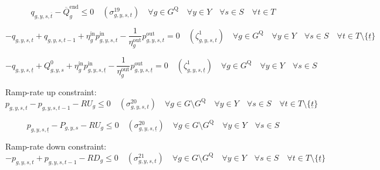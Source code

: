 \documentclass{article}
\newcommand{\sGenerators}{G}
\newcommand{\sStorage}{G^{\mathrm{Q}}}
\newcommand{\sYears}{Y}
\newcommand{\sScenarios}{S}
\newcommand{\sIntervals}{T}
\newcommand{\iGenerator}{g}
\newcommand{\iYear}{y}
\newcommand{\iScenario}{s}
\newcommand{\iInterval}{t}
\newcommand{\iIntervalTerminal}{\overline{\iInterval}}
\newcommand{\iIntervalStart}{\underline{\iInterval}}
\newcommand{\cRampRateUp}[1][\iGenerator]{RU_{#1}}
\newcommand{\cRampRateDown}[1][\iGenerator]{RD_{#1}}
\newcommand{\cStorageUnitEnergyIntervalEndMax}[1][\iGenerator]{\overline{Q}^{\mathrm{end}}_{#1}}
\newcommand{\cStorageUnitEfficiencyCharging}{\eta_{\iGenerator}^{\mathrm{in}}}
\newcommand{\cStorageUnitEfficiencyDischarging}{\eta_{\iGenerator}^{\mathrm{out}}}
\newcommand{\cPowerInitial}[1][\iGenerator,\iYear,\iScenario]{\hat{P}_{#1}}
\newcommand{\cStorageEnergyInitial}[1][\iGenerator,\iYear,\iScenario]{Q_{#1}^{0}}
\newcommand{\vPower}[1][\iGenerator,\iYear,\iScenario,\iInterval]{p_{#1}}
\newcommand{\vPowerIn}[1][\iGenerator,\iYear,\iScenario,\iInterval]{p^{\mathrm{in}}_{#1}}
\newcommand{\vPowerOut}[1][\iGenerator,\iYear,\iScenario,\iInterval]{p^{\mathrm{out}}_{#1}}
\newcommand{\vStorageUnitEnergy}[1][\iGenerator,\iYear,\iScenario,\iInterval]{q_{#1}}
\newcommand{\dMaxStorageEnergyIntervalEnd}[1][\iGenerator,\iYear,\iScenario,\iInterval]{\sigma_{#1}^{19}}
\newcommand{\dRampRateUp}[1][\iGenerator,\iYear,\iScenario,\iInterval]{\sigma_{#1}^{20}}
\newcommand{\dRampRateDown}[1][\iGenerator,\iYear,\iScenario,\iInterval]{\sigma_{#1}^{21}}
\newcommand{\dStorageEnergyTransition}[1][\iGenerator,\iYear,\iScenario,\iInterval]{\zeta_{#1}^{1}}
\newcommand{\sScenarioSets}{\quad \forall \iYear \in \sYears \quad \forall \iScenario \in \sScenarios \quad \forall \iInterval \in \sIntervals}
\begin{document}
\begin{equation}
	\vStorageUnitEnergy[\iGenerator,\iYear,\iScenario,\iIntervalTerminal] - \cStorageUnitEnergyIntervalEndMax \leq  0 \quad (\dMaxStorageEnergyIntervalEnd) \quad \forall \iGenerator \in \sStorage \sScenarioSets
\end{equation}

\begin{equation}
	- \vStorageUnitEnergy + \vStorageUnitEnergy[\iGenerator,\iYear,\iScenario,\iInterval-1] + \cStorageUnitEfficiencyCharging \vPowerIn - \frac{1}{\cStorageUnitEfficiencyDischarging} \vPowerOut = 0 \quad (\dStorageEnergyTransition) \quad \forall \iGenerator \in \sStorage \sScenarioSets \setminus \{\iIntervalStart\}
\end{equation}

\begin{equation}
	- \vStorageUnitEnergy[\iGenerator,\iYear,\iScenario,\iIntervalStart] + \cStorageEnergyInitial + \cStorageUnitEfficiencyCharging \vPowerIn[\iGenerator,\iYear,\iScenario,\iIntervalStart] - \frac{1}{\cStorageUnitEfficiencyDischarging} \vPowerOut[\iGenerator,\iYear,\iScenario,\iIntervalStart] = 0 \quad (\dStorageEnergyTransition[\iGenerator,\iYear,\iScenario,\iIntervalStart]) \quad \forall \iGenerator \in \sStorage \quad \forall \iYear \in \sYears \quad \forall \iScenario \in \sScenarios
\end{equation}

Ramp-rate up constraint:
\begin{equation}
	\vPower - \vPower[\iGenerator,\iYear,\iScenario,\iInterval-1] - \cRampRateUp \leq 0 \quad (\dRampRateUp) \quad \forall \iGenerator \in \sGenerators \setminus \sStorage \quad \forall \iYear \in \sYears \quad \forall \iScenario \in \sScenarios \quad \forall \iInterval \in \sIntervals \setminus \{\iIntervalStart\}
\end{equation}

\begin{equation}
	\vPower[\iGenerator,\iYear,\iScenario,\iIntervalStart] - \cPowerInitial - \cRampRateUp \leq 0 \quad (\dRampRateUp[\iGenerator,\iYear,\iScenario,\iIntervalStart]) \quad \forall \iGenerator \in \sGenerators \setminus \sStorage \quad \forall \iYear \in \sYears \quad \forall \iScenario \in \sScenarios
\end{equation}

Ramp-rate down constraint:
\begin{equation}
	- \vPower + \vPower[\iGenerator,\iYear,\iScenario,\iInterval-1] - \cRampRateDown \leq 0 \quad (\dRampRateDown) \quad \forall \iGenerator \in \sGenerators \setminus \sStorage \quad \forall \iYear \in \sYears \quad \forall \iScenario \in \sScenarios \quad \forall \iInterval \in \sIntervals \setminus \{\iIntervalStart\}
\end{equation}
\end{document}
